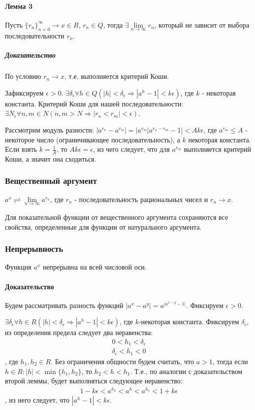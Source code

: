 \documentclass[10pt]{article}
\newcommand{\limninf}{\lim\limits_{n \to \infty}}
\begin{document}
		\paragraph{Лемма 3}
		Пусть $\{r_n\}_{n=0}^\infty \to x \in R$, $r_n \in Q$, тогда $\exists \lim\limits_{n \to \infty} r_n$, который не зависит от выбора последовательности $r_n$.
		\subparagraph{Доказательство}
		По условию $r_n \to x$, т.е. выполняется критерий Коши.
		
		Зафиксируем $\epsilon > 0$. $\exists \delta_\epsilon \forall h \in Q (|h| < \delta_\epsilon \Rightarrow |a^h - 1| < k\epsilon)$, где $k$ - некоторая константа. 
		Критерий Коши для нашей последовательности: $\exists N_\epsilon \forall n, m \in N (n,m > N \Rightarrow |r_n < r_m| < \epsilon)$.
		
		Рассмотрим модуль разности: $|a^{r_n} - a^{r_m}| = |a^{r_m}|a^{r_n - r_m} - 1| < Ak\epsilon$, где $a^{r_m} \leq A$ - некоторое число (ограничивающее последовательность), а $k$ некоторая константа.
		Если взять $k = \frac{1}{A}$, то $Ak\epsilon = \epsilon$, из чего следует, что для $a^{r_m}$ выполняется критерий Коши, а значит она сходиться. 
		
			\subsubsection{Вещественный аргумент}
			$a^x \rightleftharpoons \limninf a^{r_n}$, где $r_n$ - последовательность рациональных чисел и $r_n \to x$.
			
			Для показательной функции от вещественного аргумента сохраняются все свойства, определенные для функции от натурального аргумента.
			
			\subsubsection{Непрерывность}
			Функция $a^x$ непрерывна на всей числовой оси.
			\paragraph{Доказательство}
			Будем рассматривать разность функций $|a^x - a^y| = a^|a^{x-y} - 1|$. Фиксируем $\epsilon > 0$.
			
			$\exists \delta_\epsilon \forall h \in R (|h| < \delta_\epsilon \Rightarrow |a^h - 1| < k\epsilon)$, где $k$-некоторая константа. Фиксируем $\delta_\epsilon$, из определения предела следует два неравенства: 
			\begin{eqnarray}
				\nonumber 0 < h_1 < \delta_\epsilon\\
				\nonumber \delta_\epsilon < h_1 < 0
			\end{eqnarray}, где $h_1, h_2 \in R$. Без ограничения общности будем считать, что $a > 1$, тогда если $h \in R : |h| < \min \{h_1, h_2\}$, то $h_2 < h < h_1$. Т.е., по аналогии с доказательством второй леммы, будет выполняться следующее неравенство:
			\begin{eqnarray}
				\nonumber 1 - k\epsilon < a^{h_2} < a^h < a^{h_1} < 1 + k\epsilon
			\end{eqnarray}
			, из него следует, что $|a^h - 1| < k\epsilon$.
			
\end{document}
